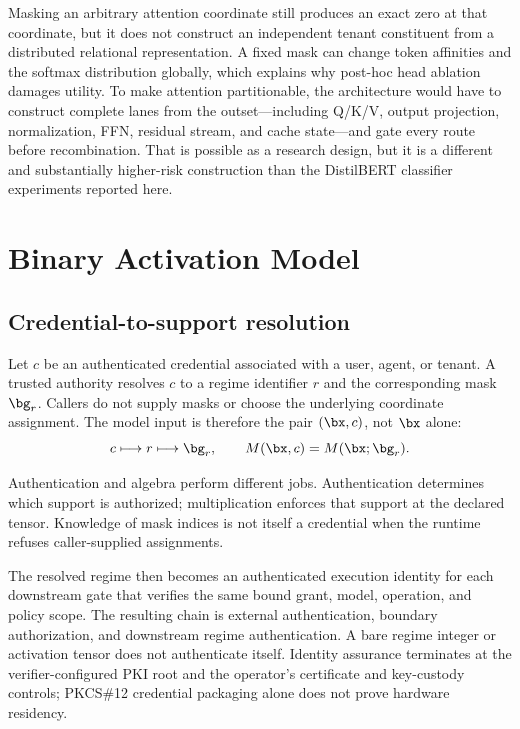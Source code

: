 \documentclass[11pt]{article}
\begin{document}
Masking an arbitrary attention coordinate still produces an exact zero at that
coordinate, but it does not construct an independent tenant constituent from a
distributed relational representation. A fixed mask can change token
affinities and the softmax distribution globally, which explains why post-hoc
head ablation damages utility. To make attention partitionable, the architecture
would have to construct complete lanes from the outset---including Q/K/V,
output projection, normalization, FFN, residual stream, and cache state---and
gate every route before recombination. That is possible as a research design,
but it is a different and substantially higher-risk construction than the
DistilBERT classifier experiments reported here.

\section{Binary Activation Model}

\subsection{Credential-to-support resolution}

Let $c$ be an authenticated credential associated with a user, agent, or
tenant. A trusted authority resolves $c$ to a regime identifier $r$ and the
corresponding mask $\bg_r$. Callers do not supply masks or choose the underlying
coordinate assignment. The model input is therefore the pair $(\bx,c)$, not
$\bx$ alone:
\begin{equation}
  c\longmapsto r\longmapsto\bg_r,
  \qquad M(\bx,c)=M(\bx;\bg_r).
\end{equation}

Authentication and algebra perform different jobs. Authentication determines
which support is authorized; multiplication enforces that support at the
declared tensor. Knowledge of mask indices is not itself a credential when the
runtime refuses caller-supplied assignments.

The resolved regime then becomes an authenticated execution identity for each
downstream gate that verifies the same bound grant, model, operation, and policy
scope. The resulting chain is external authentication, boundary authorization,
and downstream regime authentication. A bare regime integer or activation
tensor does not authenticate itself. Identity assurance terminates at the
verifier-configured PKI root and the operator's certificate and key-custody
controls; PKCS\#12 credential packaging alone does not prove hardware residency.
\end{document}
